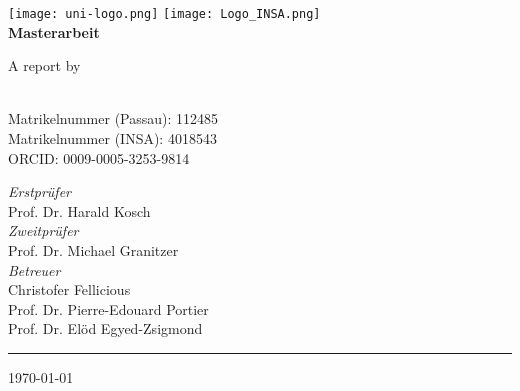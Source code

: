 \begin{titlepage}
    \centering
    \begin{onehalfspace}
    	
        	\texttt{[image: uni-logo.png]}
			\hspace*{1.0cm}
			\texttt{[image: Logo\_INSA.png]}\\
        	\vspace{1.0cm}
        	{\Large \bfseries Masterarbeit}\\

        	\vspace{2.5cm}

            \begin{doublespace}
            	{\textsf{\Huge{\thetitle}}}
            \end{doublespace}

        	\vspace{2cm}

            {\Large A report by}\\

        	\vspace{1cm}

        	{\bfseries \large{\theauthor}} \\
			\vspace{0.5cm}
			Matrikelnummer (Passau): 112485 \\
			Matrikelnummer (INSA): 4018543 \\
			ORCID: 0009-0005-3253-9814 \\

        	\vfill

        	{\Large
                \textit{Erstpr\"ufer} \\
				Prof. Dr. Harald Kosch \\
				\textit{Zweitpr\"ufer} \\
				Prof. Dr. Michael Granitzer\\
				\vspace{0.5cm}
				\textit{Betreuer} \\
				Christofer Fellicious\\
				Prof. Dr. Pierre-Edouard Portier\\
				Prof. Dr. Elöd Egyed-Zsigmond\\
        	}

        	\vspace{1cm}

        	\parbox{\linewidth}{\hrule\strut}

            \vfill

			{\large \today}
    \end{onehalfspace}
\end{titlepage}
